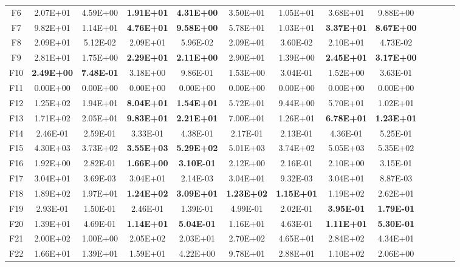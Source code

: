\begin{table*}[!ht]
\begin{tabular}{|c|cc|cc|cc|cc|cc|cc|}
    \cline{1-9}
    F6    & 2.07E+01 & 4.59E+00 & \textbf{1.91E+01} & \textbf{4.31E+00} & 3.50E+01 & 1.05E+01 & 3.68E+01 & 9.88E+00 \\
    F7    & 9.82E+01 & 1.14E+01 & \textbf{4.76E+01} & \textbf{9.58E+00} & 5.78E+01 & 1.03E+01 & \textbf{3.37E+01} & \textbf{8.67E+00} \\
    F8    & 2.09E+01 & 5.12E-02 & 2.09E+01 & 5.96E-02 & 2.09E+01 & 3.60E-02 & 2.10E+01 & 4.73E-02 \\
    F9    & 2.81E+01 & 1.75E+00 & \textbf{2.29E+01} & \textbf{2.11E+00} & 2.90E+01 & 1.39E+00 & \textbf{2.45E+01} & \textbf{3.17E+00} \\
    F10   & \textbf{2.49E+00} & \textbf{7.48E-01} & 3.18E+00 & 9.86E-01 & 1.53E+00 & 3.04E-01 & 1.52E+00 & 3.63E-01 \\
    F11   & 0.00E+00 & 0.00E+00 & 0.00E+00 & 0.00E+00 & 0.00E+00 & 0.00E+00 & 0.00E+00 & 0.00E+00 \\
    F12   & 1.25E+02 & 1.94E+01 & \textbf{8.04E+01} & \textbf{1.54E+01} & 5.72E+01 & 9.44E+00 & 5.70E+01 & 1.02E+01 \\
    F13   & 1.71E+02 & 2.05E+01 & \textbf{9.83E+01} & \textbf{2.21E+01} & 7.00E+01 & 1.26E+01 & \textbf{6.78E+01} & \textbf{1.23E+01} \\
    F14   & 2.46E-01 & 2.59E-01 & 3.33E-01 & 4.38E-01 & 2.17E-01 & 2.13E-01 & 4.36E-01 & 5.25E-01 \\
    F15   & 4.30E+03 & 3.73E+02 & \textbf{3.55E+03} & \textbf{5.29E+02} & 5.01E+03 & 3.74E+02 & 5.05E+03 & 5.35E+02 \\
    F16   & 1.92E+00 & 2.82E-01 & \textbf{1.66E+00} & \textbf{3.10E-01} & 2.12E+00 & 2.16E-01 & 2.10E+00 & 3.15E-01 \\
    F17   & 3.04E+01 & 3.69E-03 & 3.04E+01 & 2.14E-03 & 3.04E+01 & 9.32E-03 & 3.04E+01 & 8.87E-03 \\
    F18   & 1.89E+02 & 1.97E+01 & \textbf{1.24E+02} & \textbf{3.09E+01} & \textbf{1.23E+02} & \textbf{1.15E+01} & 1.19E+02 & 2.62E+01 \\
    F19   & 2.93E-01 & 1.50E-01 & 2.46E-01 & 1.39E-01 & 4.99E-01 & 2.02E-01 & \textbf{3.95E-01} & \textbf{1.79E-01} \\
    F20   & 1.39E+01 & 4.69E-01 & \textbf{1.14E+01} & \textbf{5.04E-01} & 1.16E+01 & 4.63E-01 & \textbf{1.11E+01} & \textbf{5.30E-01} \\
    \cline{1-9}
    F21   & 2.00E+02 & 1.00E+00 & 2.05E+02 & 2.03E+01 & 2.70E+02 & 4.65E+01 & 2.84E+02 & 4.34E+01 \\
    F22   & 1.66E+01 & 1.39E+01 & 1.59E+01 & 4.22E+00 & 9.78E+01 & 2.88E+01 & 1.10E+02 & 2.06E+00 \\

\end{tabular}
\end{table*}
